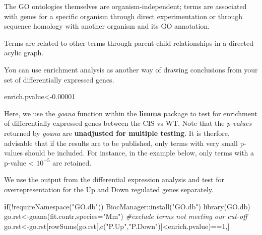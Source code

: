 \documentclass[
  openany]{book}
\newenvironment{Shaded}{\begin{snugshade}}{\end{snugshade}}
\newcommand{\AttributeTok}[1]{\textcolor[rgb]{0.77,0.63,0.00}{#1}}
\newcommand{\CommentTok}[1]{\textcolor[rgb]{0.56,0.35,0.01}{\textit{#1}}}
\newcommand{\ControlFlowTok}[1]{\textcolor[rgb]{0.13,0.29,0.53}{\textbf{#1}}}
\newcommand{\DecValTok}[1]{\textcolor[rgb]{0.00,0.00,0.81}{#1}}
\newcommand{\FloatTok}[1]{\textcolor[rgb]{0.00,0.00,0.81}{#1}}
\newcommand{\FunctionTok}[1]{\textcolor[rgb]{0.00,0.00,0.00}{#1}}
\newcommand{\NormalTok}[1]{#1}
\newcommand{\OtherTok}[1]{\textcolor[rgb]{0.56,0.35,0.01}{#1}}
\newcommand{\SpecialCharTok}[1]{\textcolor[rgb]{0.00,0.00,0.00}{#1}}
\newcommand{\StringTok}[1]{\textcolor[rgb]{0.31,0.60,0.02}{#1}}
\begin{document}
The GO ontologies themselves are organism-independent; terms are associated with genes for a specific organism through direct experimentation or through sequence homology with another organism and its GO annotation.

Terms are related to other terms through parent-child relationships in a directed acylic graph.

You can use enrichment analysis as another way of drawing conclusions from your set of differentially expressed genes.

\begin{Shaded}
\begin{Highlighting}[]
\NormalTok{enrich.pvalue}\OtherTok{\textless{}{-}}\FloatTok{0.00001}
\end{Highlighting}
\end{Shaded}

Here, we use the \emph{goana} function within the \textbf{limma} package to test for enrichment of differentially expressed genes between the CIS vs WT. Note that the \emph{p-values} returned by \emph{goana} are \textbf{unadjusted for multiple testing}. It is therfore, advisable that if the results are to be published, only terms with very small p-values should be included. For instance, in the example below, only terms with a p-value \textless{} \ensuremath{10^{-5}} are retained.

We use the output from the differential expression analysis and test for overrepresentation for the Up and Down regulated genes separately.

\begin{Shaded}
\begin{Highlighting}[]
\ControlFlowTok{if}\NormalTok{(}\SpecialCharTok{!}\FunctionTok{requireNamespace}\NormalTok{(}\StringTok{"GO.db"}\NormalTok{))}
\NormalTok{  BiocManager}\SpecialCharTok{::}\FunctionTok{install}\NormalTok{(}\StringTok{"GO.db"}\NormalTok{)}
\FunctionTok{library}\NormalTok{(GO.db)}
\NormalTok{go.rst}\OtherTok{\textless{}{-}}\FunctionTok{goana}\NormalTok{(fit.contr,}\AttributeTok{species=}\StringTok{"Mm"}\NormalTok{)}
\CommentTok{\#exclude terms not meeting our cut{-}off}
\NormalTok{go.rst}\OtherTok{\textless{}{-}}\NormalTok{go.rst[}\FunctionTok{rowSums}\NormalTok{(go.rst[,}\FunctionTok{c}\NormalTok{(}\StringTok{"P.Up"}\NormalTok{,}\StringTok{"P.Down"}\NormalTok{)]}\SpecialCharTok{\textless{}}\NormalTok{enrich.pvalue)}\SpecialCharTok{==}\DecValTok{1}\NormalTok{,]}
\end{Highlighting}
\end{Shaded}
\end{document}
